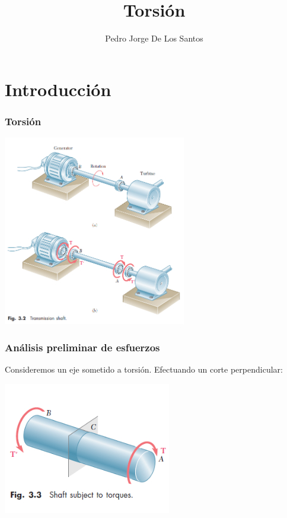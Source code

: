 \documentclass{beamer}
\title{Torsión}
\author{Pedro Jorge De Los Santos}
\institute{
    {\bf 
    Instituto Tecnológico de Celaya \\
    Departamento de Ingeniería Mecánica \\
    }
}
\begin{document}
\begin{frame}
\titlepage
\end{frame}

\section{Introducción}

\begin{frame}
\justifying
\frametitle{Torsión}

\begin{center}
\includegraphics[width=0.6\textwidth]{img/flecha_transmision.PNG}
\end{center}

\end{frame}


\begin{frame}
\justifying
\frametitle{Análisis preliminar de esfuerzos}

Consideremos un eje sometido a torsión. Efectuando un corte perpendicular:

\begin{center}
\includegraphics[width=0.55\textwidth]{img/shaft_torque.PNG}
\end{center}

\end{frame}
\end{document}
